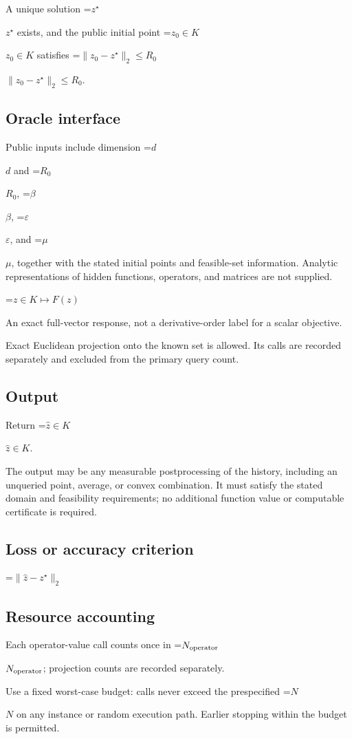 \documentclass[10pt,a4paper]{article}
\newcommand{\AtlasMath}[1]{\par\begingroup\centering\setbox0=\hbox{$\displaystyle #1$}\ifdim\wd0>1.4\linewidth\typeout{ATLAS WIDE FORMULA: \the\wd0}\fi\ifdim\wd0>\linewidth\resizebox{\linewidth}{!}{\box0}\else\box0\fi\par\endgroup}
\newcommand{\AtlasInlineMath}[1]{\begingroup\setbox0=\hbox{$#1$}\ifdim\wd0>.4\linewidth\endgroup\AtlasMath{#1}\else\endgroup$#1$\fi}
\begin{document}
A unique solution \AtlasInlineMath{z^\star} exists, and the public initial point \AtlasInlineMath{z_0\in K} satisfies \AtlasInlineMath{\|z_0-z^\star\|_2\le R_0}.

\subsection{Oracle interface}
Public inputs include dimension \AtlasInlineMath{d} and \AtlasInlineMath{R_0}, \AtlasInlineMath{\beta}, \AtlasInlineMath{\varepsilon}, and \AtlasInlineMath{\mu}, together with the stated initial points and feasible-set information. Analytic representations of hidden functions, operators, and matrices are not supplied.


\AtlasMath{z\in K\longmapsto F(z)}


An exact full-vector response, not a derivative-order label for a scalar objective.

Exact Euclidean projection onto the known set is allowed. Its calls are recorded separately and excluded from the primary query count.

\subsection{Output}
Return \AtlasInlineMath{\widehat{z}\in K}.

The output may be any measurable postprocessing of the history, including an unqueried point, average, or convex combination. It must satisfy the stated domain and feasibility requirements; no additional function value or computable certificate is required.

\subsection{Loss or accuracy criterion}

\AtlasMath{\|\widehat{z}-z^\star\|_2}


\subsection{Resource accounting}
Each operator-value call counts once in \AtlasInlineMath{N_{\rm operator}}; projection counts are recorded separately.

Use a fixed worst-case budget: calls never exceed the prespecified \AtlasInlineMath{N} on any instance or random execution path. Earlier stopping within the budget is permitted.
\end{document}

